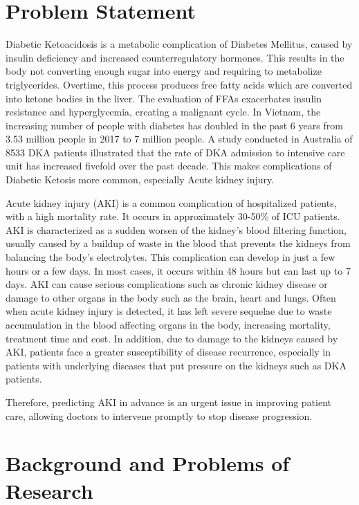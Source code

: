 \documentclass[../main.tex]{subfiles}
\begin{document}
\section{Problem Statement}
\label{sec:dvd}

Diabetic Ketoacidosis is a metabolic complication of Diabetes Mellitus, caused by insulin deficiency and increased counterregulatory hormones.
This results in the body not converting enough sugar into energy and requiring to metabolize triglycerides.
Overtime, this process produces free fatty acids which are converted into ketone bodies in the liver.
The evaluation of FFAs exacerbates insulin resistance and hyperglycemia, creating a malignant cycle.
In Vietnam, the increasing number of people with diabetes has doubled in the past 6 years from 3.53 million people in 2017 to 7 million people. %
A study conducted in Australia of 8533 DKA patients illustrated that the rate of DKA admission to intensive care unit has increased fivefold over the past decade.
This makes complications of Diabetic Ketosis more common, especially Acute kidney injury.

Acute kidney injury (AKI) is a common complication of hospitalized patients, with a high mortality rate.
It occurs in approximately 30-50\% of ICU patients.
AKI is characterized as a sudden worsen of the kidney's blood filtering function, usually caused by a buildup of waste in the blood that prevents the kidneys from balancing the body's electrolytes.
This complication can develop in just a few hours or a few days.
In most cases, it occurs within 48 hours but can last up to 7 days.
AKI can cause serious complications such as chronic kidney disease or damage to other organs in the body such as the brain, heart and lungs.
Often when acute kidney injury is detected, it has left severe sequelae due to waste accumulation in the blood affecting organs in the body, increasing mortality, treatment time and cost.
In addition, due to damage to the kidneys caused by AKI, patients face a greater susceptibility of disease recurrence, especially in patients with underlying diseases that put pressure on the kidneys such as DKA patients.

Therefore, predicting AKI in advance is an urgent issue in improving patient care, allowing doctors to intervene promptly to stop disease progression.



\section{Background and Problems of Research} 
\label{sec:giaiphap}
\end{document}
